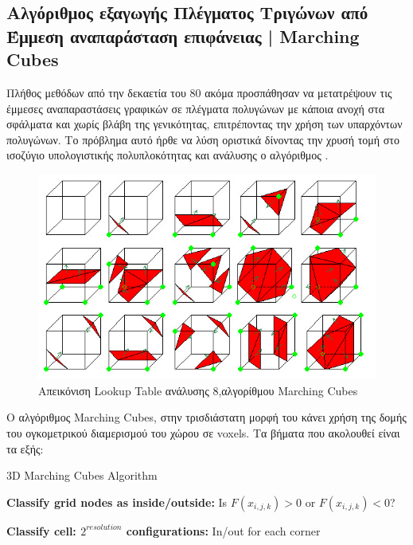 \begin{appendices}
        \subsection*{Αλγόριθμος εξαγωγής Πλέγματος Τριγώνων από Έμμεση αναπαράσταση επιφάνειας | Marching Cubes}
        \par 
            Πλήθος μεθόδων από την δεκαετία του 80 ακόμα προσπάθησαν να μετατρέψουν τις έμμεσες αναπαραστάσεις γραφικών σε πλέγματα πολυγώνων με κάποια ανοχή στα σφάλματα και χωρίς βλάβη της γενικότητας, επιτρέποντας την χρήση των υπαρχόντων πολυγώνων. Το πρόβλημα αυτό ήρθε να λύση οριστικά δίνοντας την χρυσή τομή στο ισοζύγιο υπολογιστικής πολυπλοκότητας και ανάλυσης ο αλγόριθμος .
        \par
            \begin{figure}[H]
                \centering
                \includegraphics[width = 0.8\linewidth]{images/chapter2_img/marching_cubes.jpg}
                \caption{Απεικόνιση Lookup Table ανάλυσης 8,αλγορίθμου Marching Cubes}
                \label{fig:marchingcubes}
            \end{figure}
            Ο αλγόριθμος Marching Cubes\cite{marchingcubes}, στην τρισδιάστατη μορφή του κάνει χρήση της δομής του ογκομετρικού διαμερισμού του χώρου σε voxels. Τα βήματα που ακολουθεί είναι τα εξής:
           \begin{algorithm}[H]
            \caption{3D Marching Cubes Algorithm}
            \begin{algorithmic}
            \State \textbf{Classify grid nodes as inside/outside:}
            \State Is $F(x_{i,j,k}) > 0$ or $F(x_{i,j,k}) < 0$?
            \EndFor
            
            \State \textbf{Classify cell: $2^{resolution}$ configurations:}
            \State In/out for each corner
            \EndFor
            

\end{algorithmic}
\end{algorithm}
\end{appendices}
